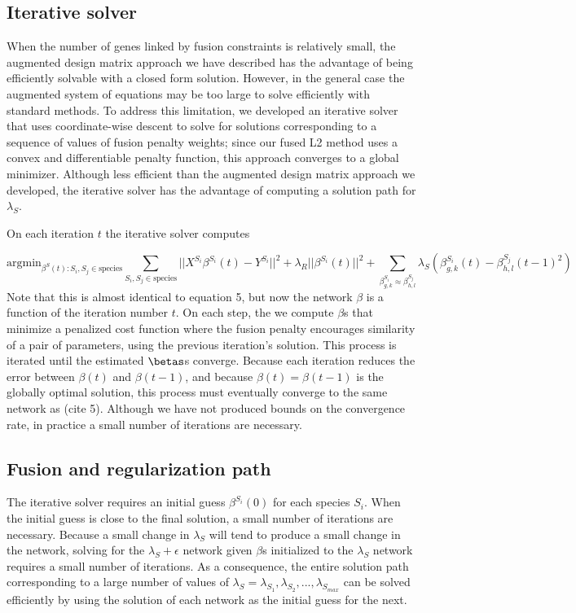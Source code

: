 \documentclass[11pt]{article}
\begin{document}
\subsection{Iterative solver}

When the number of genes linked by fusion constraints is relatively small, the augmented design matrix approach we have described has the advantage of being efficiently solvable with a closed form solution. However, in the general case the augmented system of equations may be too large to solve efficiently with standard methods. To address this limitation, we developed an iterative solver that uses coordinate-wise descent to solve for solutions corresponding to a sequence of values of fusion penalty weights; since our fused L2 method uses a convex and differentiable penalty function, this approach converges to a global minimizer. Although less efficient than the augmented design matrix approach we developed, the iterative solver has the advantage of computing a solution path for $\lambda_S$.

On each iteration $t$ the iterative solver computes


\begin{equation}
\text{argmin}_{\beta^S(t) : S_i, S_j \in \text{species}} \displaystyle\sum_{S_i, S_j \in \text{species}} ||X^{S_i}\beta^{S_i}(t) - Y^{S_i}||^2 + \lambda_R||\beta^{S_i}(t)||^2 + \displaystyle \sum_{\beta_{g,k}^{S_i} \approx \beta_{h,l}^{S_j}} \lambda_S(\beta^{S_i}_{g,k}(t) - \beta_{h,l}^{S_j}(t-1)^2)
\end{equation}
Note that this is almost identical to equation 5, but now the network $\beta$ is a function of the iteration number $t$. On each step, the we compute $\beta$s that minimize a penalized cost function where the fusion penalty encourages similarity of a pair of parameters, using the previous iteration's solution. This process is iterated until the estimated $\betas$s converge. Because each iteration reduces the error between $\beta(t)$ and $\beta(t-1)$, and because $\beta(t) = \beta(t-1)$ is the globally optimal solution, this process must eventually converge to the same network as (cite 5). Although we have not produced bounds on the convergence rate, in practice a small number of iterations are necessary. 

\subsection{Fusion and regularization path}
The iterative solver requires an initial guess $\beta^{S_i}(0)$ for each species $S_i$. When the initial guess is close to the final solution, a small number of iterations are necessary. Because a small change in $\lambda_S$ will tend to produce a small change in the network, solving for the $\lambda_S+\epsilon$ network given $\beta$s initialized to the $\lambda_S$ network requires a small number of iterations. As a consequence, the entire solution path corresponding to a large number of values of $\lambda_S= \lambda_S_1, \lambda_S_2, ..., \lambda_S_{max}$ can be solved efficiently by using the solution of each network as the initial guess for the next. 
\end{document}

